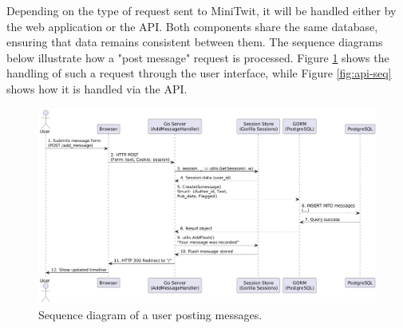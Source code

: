 
Depending on the type of request sent to MiniTwit, it will be handled either by the web application or the API. Both components share the same database, ensuring that data remains consistent between them. The sequence diagrams below illustrate how a "post message" request is processed. Figure \ref{fig:user-seq} shows the handling of such a request through the user interface, while Figure \ref{fig:api-seq} shows how it is handled via the API.

\begin{figure}[H]
\includegraphics[width=\textwidth]{images/user-seq-diagram.png}
\centering
\caption{Sequence diagram of a user posting messages.}
\label{fig:user-seq}
\end{figure}
